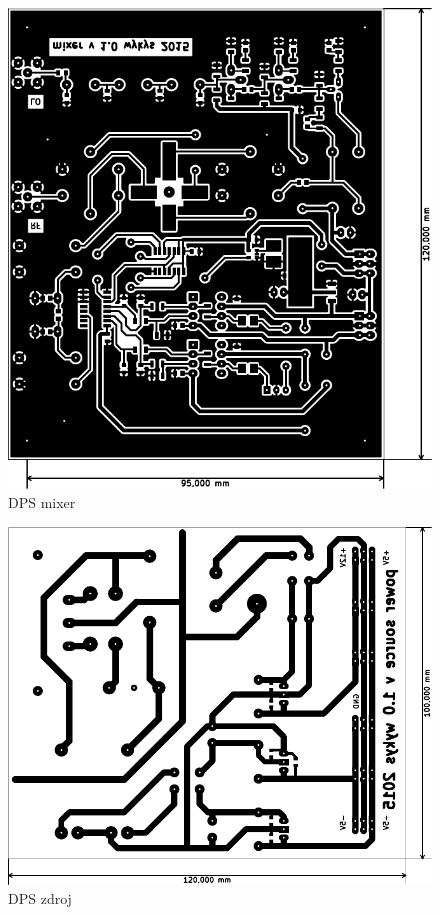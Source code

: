   	\begin{figure}[H]
    	\centering
    	\includegraphics[width=160mm]{img/mixer-brd.pdf}
    	\caption{DPS mixer}    		
  	\end{figure}
  	
  	\begin{figure}[H]
    	\centering
    	\includegraphics[width=160mm]{img/zdroj-brd.pdf}
    	\caption{DPS zdroj}    		
  	\end{figure}
  	
